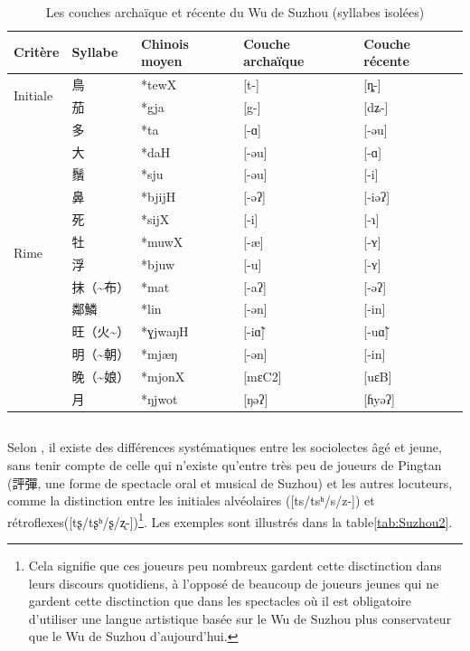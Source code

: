\documentclass{scrbook}
\newcounter{c}[subsubsection]
\newcommand{\bolang}{\textasciitilde}
\newcommand{\difwenbai}{couches archaïque et récente\xspace}
\newcommand{\diflaoxin}{sociolectes âgé et jeune\xspace}
\newcommand{\iso}{syllabes isolées\xspace}
\newcommand{\illustre}{Les exemples sont illustrés dans la table\xspace}
\begin{document}
\begin{sloppypar}
\begin{table}[htbp]
  \centering
    \begin{tabular}{lllll}
    \toprule
    Critère & Syllabe & Chinois moyen  & Couche archaïque & Couche récente \\
    \midrule
    \multirow{2}[2]{*}{Initiale} & 鳥     & *tewX & [t-]  & [ȵ-] \\
          & 茄     & *gja  & [g-]  & [dʑ-] \\
    \midrule
    \multirow{12}[2]{*}{Rime} & 多     & *ta   & [-ɑ]  & [-əu] \\
          & 大     & *daH  & [-əu] & [-ɑ] \\
          & 鬚     & *sju  & [-əu] & [-i] \\
          & 鼻     & *bjijH & [-əʔ] & [-iəʔ] \\
          & 死     & *sijX & [-i]  & [-ɿ] \\
          & 牡     & *muwX & [-æ]  & [-ʏ] \\
          & 浮     & *bjuw & [-u]  & [-ʏ] \\
          & 抹（\bolang 布） & *mat  & [-aʔ] & [-əʔ] \\
          & 鄰鱗    & *lin  & [-ən] & [-in] \\
          & 旺（火\bolang ） & *ɣjwaŋH & [-iɑ̃] & [-uɑ̃] \\
          & 明（\bolang 朝） & *mjæŋ & [-ən] & [-in] \\
    \midrule
    \multirow{2}[2]{*}{Syllabe} & 晚（\bolang 娘） & *mjonX & [mɛC2] & [uɛB] \\
          & 月     & *ŋjwot & [ŋəʔ] & [ɦyəʔ] \\
    \bottomrule
    \end{tabular}%
  \caption{Les \difwenbai du Wu de Suzhou (\iso)}
  \label{tab:Suzhou1iso}%
\end{table}%

\subsection{\MakeCapital{\diflaoxin}}
Selon \textcite[4--5]{Ye1993Suzhou}, il existe des différences systématiques entre les \diflaoxin, sans tenir compte de celle qui n'existe qu'entre très peu de joueurs de Pingtan (評彈, une forme de spectacle oral et musical de Suzhou) et les autres locuteurs, comme la distinction entre les initiales alvéolaires ([ts/tsʰ/s/z-]) et rétroflexes([tʂ/tʂʰ/ʂ/ʐ-])\footnote{Cela signifie que ces joueurs peu nombreux gardent cette disctinction dans leurs discours quotidiens, à l'opposé de beaucoup de joueurs jeunes qui ne gardent cette disctinction que dans les spectacles où il est obligatoire d'utiliser une langue artistique basée sur le Wu de Suzhou plus conservateur que le Wu de Suzhou d'aujourd'hui.}. \illustre \ref{tab:Suzhou2}.


\end{sloppypar}
\end{document}
